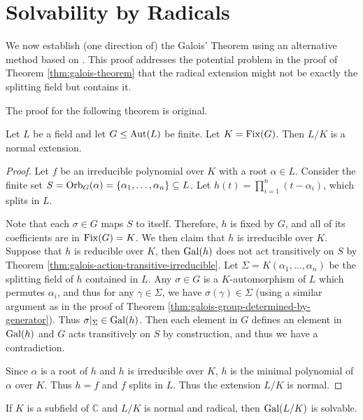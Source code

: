 \section{Solvability by Radicals} \label{sec:radical-alter}

We now establish (one direction of) the Galois' Theorem using an alternative method based on \cite{Stewart}. This proof addresses the potential problem in the proof of Theorem \ref{thm:galois-theorem} that the radical extension might not be exactly the splitting field but contains it.  

The proof for the following theorem is original. 
\begin{theorem} \label{thm:fix-extension-normal}
	Let $L$ be a field and let $G \le \operatorname{Aut}(L)$ be finite. Let $K = \operatorname{Fix}(G)$. Then $L/K$ is a normal extension.
\end{theorem}

\begin{proof}
	
	Let $f$ be an irreducible polynomial over $K$ with a root $\alpha \in L$. Consider the finite set $S = \operatorname{Orb}_G(\alpha) = \{ \alpha_1, \ldots, \alpha_n\} \subseteq L$. Let $h(t) = \prod_{i = 1} ^n (t - \alpha_i)$, which splits in $L$.
	
	Note that each $\sigma \in G$ maps $S$ to itself. Therefore, $h$ is fixed by $G$, and all of its coefficients are in $\operatorname{Fix}(G) = K$. We then claim that $h$ is irreducible over $K$. Suppose that $h$ is reducible over $K$, then $\operatorname{Gal}(h)$ does not act transitively on $S$ by Theorem \ref{thm:galois-action-transitive-irreducible}. Let $\Sigma = K(\alpha_1, \dots, \alpha_n)$ be the splitting field of $h$ contained in $L$.  Any $\sigma \in G$ is a $K$-automorphism of $L$ which permutes $\alpha_i$, and thus for any $\gamma \in \Sigma$, we have $\sigma(\gamma) \in \Sigma$ (using a similar argument as in the proof of Theorem \ref{thm:galois-group-determined-by-generator}). Thus $\sigma | _ \Sigma \in \operatorname{Gal}(h)$. 
	Then each element in $G$ defines an element in $\operatorname{Gal}(h)$ and $G$ acts transitively on $S$ by construction, and thus we have a contradiction. 
	
	Since $\alpha$ is a root of $h$ and $h$ is irreducible over $K$, $h$ is the minimal polynomial of $\alpha$ over $K$. Thus $h = f$ and $f$ splits in $L$. Thus the extension $L/K$ is normal. 
\end{proof}


\begin{theorem} \label{thm:radical-3}
	If $K$ is a subfield of $\mathbb{C}$ and $L / K$ is normal and radical, then $\operatorname{Gal}(L / K)$ is solvable.
\end{theorem}

